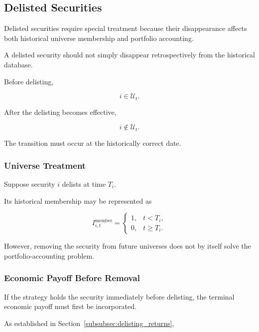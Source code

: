 \documentclass[11pt,a4paper]{article}
\begin{document}
\subsection{Delisted Securities}
\label{subsec:pit_delisted_securities}

Delisted securities require special treatment because their disappearance
affects both historical universe membership and portfolio accounting.

A delisted security should not simply disappear retrospectively from the
historical database.

Before delisting,

\begin{equation}
i\in\mathcal{U}_t.
\end{equation}

After the delisting becomes effective,

\begin{equation}
i\notin\mathcal{U}_t.
\end{equation}

The transition must occur at the historically correct date.


\subsubsection{Universe Treatment}

Suppose security $i$ delists at time $T_i$.

Its historical membership may be represented as

\begin{equation}
I_{i,t}^{\mathrm{member}}
=
\begin{cases}
1,
&
t<T_i,
\\
0,
&
t\geq T_i.
\end{cases}
\end{equation}

However, removing the security from future universes does not by itself solve
the portfolio-accounting problem.


\subsubsection{Economic Payoff Before Removal}

If the strategy holds the security immediately before delisting, the terminal
economic payoff must first be incorporated.

As established in Section~\ref{subsubsec:delisting_returns},
\end{document}
